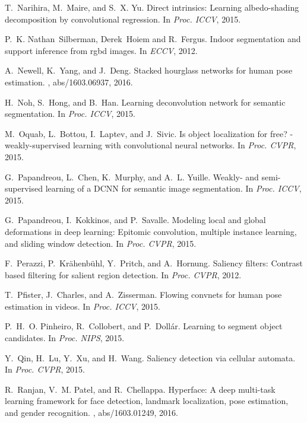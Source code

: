 \documentclass[10pt,twocolumn,letterpaper]{article}
\begin{document}
\begin{thebibliography}{100}
	T.~Narihira, M.~Maire, and S.~X. Yu.
	\newblock Direct intrinsics: Learning albedo-shading decomposition by
	convolutional regression.
	\newblock In {\em Proc. {ICCV}}, 2015.
	
	P.~K. Nathan~Silberman, Derek~Hoiem and R.~Fergus.
	\newblock Indoor segmentation and support inference from rgbd images.
	\newblock In {\em ECCV}, 2012.
	
	A.~Newell, K.~Yang, and J.~Deng.
	\newblock Stacked hourglass networks for human pose estimation.
	, abs/1603.06937, 2016.
	
	H.~Noh, S.~Hong, and B.~Han.
	\newblock Learning deconvolution network for semantic segmentation.
	\newblock In {\em Proc. {ICCV}}, 2015.
	
	M.~Oquab, L.~Bottou, I.~Laptev, and J.~Sivic.
	\newblock Is object localization for free? - weakly-supervised learning with
	convolutional neural networks.
	\newblock In {\em Proc. {CVPR}}, 2015.
	
	G.~Papandreou, L.~Chen, K.~Murphy, and A.~L. Yuille.
	\newblock Weakly- and semi-supervised learning of a {DCNN} for semantic image
	segmentation.
	\newblock In {\em Proc. {ICCV}}, 2015.
	
	G.~Papandreou, I.~Kokkinos, and P.~Savalle.
	\newblock Modeling local and global deformations in deep learning: Epitomic
	convolution, multiple instance learning, and sliding window detection.
	\newblock In {\em Proc. {CVPR}}, 2015.
	
	F.~Perazzi, P.~Kr{\"{a}}henb{\"{u}}hl, Y.~Pritch, and A.~Hornung.
	\newblock Saliency filters: Contrast based filtering for salient region
	detection.
	\newblock In {\em Proc. {CVPR}}, 2012.
	
	T.~Pfister, J.~Charles, and A.~Zisserman.
	\newblock Flowing convnets for human pose estimation in videos.
	\newblock In {\em Proc. {ICCV}}, 2015.
	
	P.~H.~O. Pinheiro, R.~Collobert, and P.~Doll{\'{a}}r.
	\newblock Learning to segment object candidates.
	\newblock In {\em Proc. {NIPS}}, 2015.
	
	Y.~Qin, H.~Lu, Y.~Xu, and H.~Wang.
	\newblock Saliency detection via cellular automata.
	\newblock In {\em Proc. {CVPR}}, 2015.
	
	R.~Ranjan, V.~M. Patel, and R.~Chellappa.
	\newblock Hyperface: {A} deep multi-task learning framework for face detection,
	landmark localization, pose estimation, and gender recognition.
	, abs/1603.01249, 2016.
	

\end{thebibliography}
\end{document}
